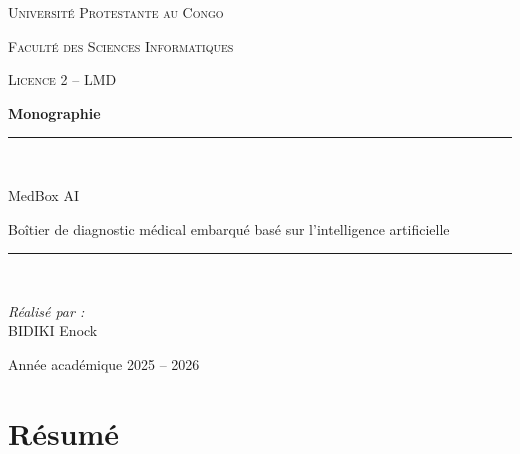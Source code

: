 \documentclass[12pt,a4paper]{report}
\newcommand{\titreProjet}{MedBox AI}
\newcommand{\sousTitre}{Boîtier de diagnostic médical embarqué basé sur l'intelligence artificielle}
\newcommand{\nomEtudiant}{BIDIKI Enock}
\newcommand{\nomEtablissement}{Université Protestante au Congo}
\newcommand{\nomFaculte}{Faculté des Sciences Informatiques}
\newcommand{\nomFormation}{Licence 2 -- LMD}
\newcommand{\anneeUniv}{Année académique 2025 -- 2026}
\begin{document}
\begin{titlepage}
    \centering
    {\scshape\Large \nomEtablissement \par}
    {\scshape \nomFaculte \par}
    {\scshape \nomFormation \par}
    \vspace{2cm}

    {\huge\bfseries Monographie \par}
    \vspace{1cm}
    \rule{\linewidth}{0.5mm} \\[0.4cm]
    {\Huge \titreProjet \par}
    {\large \sousTitre \par}
    \rule{\linewidth}{0.5mm} \\[1.5cm]

    \begin{minipage}{0.45\textwidth}
        \begin{center} \large
            \textit{Réalisé par :}\\
            \nomEtudiant
        \end{center}
    \end{minipage}

    \vfill
    {\large \anneeUniv \par}
\end{titlepage}

\chapter*{Résumé}
\end{document}
